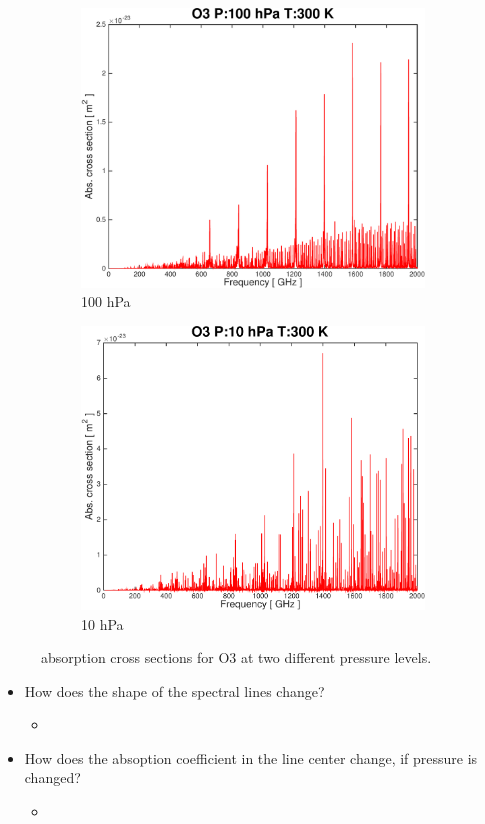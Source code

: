 \documentclass[paper=a4, fontsize=11pt]{scrartcl} %
\begin{document}
\begin{figure}[t!]
    \begin{subfigure}[b]{0.45\textwidth}
        \includegraphics[width=\textwidth]{plots/plot_xsec_O3_100hPa_300K.pdf}
        \caption{100 hPa}
    \end{subfigure}
    \begin{subfigure}[b]{0.45\textwidth}
        \includegraphics[width=\textwidth]{plots/plot_xsec_O3_10hPa_300K.pdf}
        \caption{10 hPa}
    \end{subfigure}

    \caption{absorption cross sections for O3 at two different pressure levels.}
    \label{fig:abs_pressure}
\end{figure}

\begin{itemize}
    \item How does the shape of the spectral lines change?
    \begin{itemize}
        \item
    \end{itemize}
    \item How does the absoption coefficient in the line center change, if pressure is changed?
    \begin{itemize}
        \item
    \end{itemize}
\end{itemize}
\end{document}

